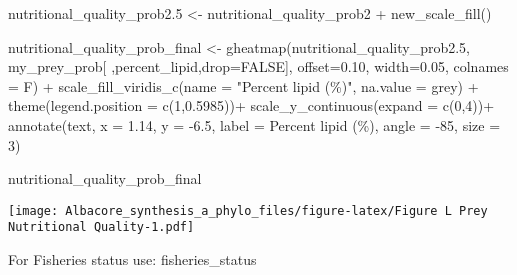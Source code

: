 \documentclass[
]{article}
\newenvironment{Shaded}{\begin{snugshade}}{\end{snugshade}}
\newcommand{\AttributeTok}[1]{\textcolor[rgb]{0.77,0.63,0.00}{#1}}
\newcommand{\ConstantTok}[1]{\textcolor[rgb]{0.00,0.00,0.00}{#1}}
\newcommand{\DecValTok}[1]{\textcolor[rgb]{0.00,0.00,0.81}{#1}}
\newcommand{\FloatTok}[1]{\textcolor[rgb]{0.00,0.00,0.81}{#1}}
\newcommand{\FunctionTok}[1]{\textcolor[rgb]{0.00,0.00,0.00}{#1}}
\newcommand{\NormalTok}[1]{#1}
\newcommand{\OtherTok}[1]{\textcolor[rgb]{0.56,0.35,0.01}{#1}}
\newcommand{\SpecialCharTok}[1]{\textcolor[rgb]{0.00,0.00,0.00}{#1}}
\newcommand{\StringTok}[1]{\textcolor[rgb]{0.31,0.60,0.02}{#1}}
\begin{document}
\begin{Shaded}
\begin{Highlighting}[]
\NormalTok{nutritional\_quality\_prob2}\FloatTok{.5} \OtherTok{\textless{}{-}}\NormalTok{ nutritional\_quality\_prob2 }\SpecialCharTok{+} \FunctionTok{new\_scale\_fill}\NormalTok{()}

\NormalTok{nutritional\_quality\_prob\_final }\OtherTok{\textless{}{-}} \FunctionTok{gheatmap}\NormalTok{(nutritional\_quality\_prob2}\FloatTok{.5}\NormalTok{, my\_prey\_prob[ ,}\StringTok{\textquotesingle{}percent\_lipid\textquotesingle{}}\NormalTok{,}\AttributeTok{drop=}\ConstantTok{FALSE}\NormalTok{], }
                                           \AttributeTok{offset=}\FloatTok{0.10}\NormalTok{, }\AttributeTok{width=}\FloatTok{0.05}\NormalTok{, }\AttributeTok{colnames =}\NormalTok{ F) }\SpecialCharTok{+}
  \FunctionTok{scale\_fill\_viridis\_c}\NormalTok{(}\AttributeTok{name =} \StringTok{"Percent lipid (\%)"}\NormalTok{, }
                       \AttributeTok{na.value =} \StringTok{\textquotesingle{}grey\textquotesingle{}}\NormalTok{) }\SpecialCharTok{+}
  \FunctionTok{theme}\NormalTok{(}\AttributeTok{legend.position =} \FunctionTok{c}\NormalTok{(}\DecValTok{1}\NormalTok{,}\FloatTok{0.5985}\NormalTok{))}\SpecialCharTok{+}
  \FunctionTok{scale\_y\_continuous}\NormalTok{(}\AttributeTok{expand =} \FunctionTok{c}\NormalTok{(}\DecValTok{0}\NormalTok{,}\DecValTok{4}\NormalTok{))}\SpecialCharTok{+}
  \FunctionTok{annotate}\NormalTok{(}\StringTok{\textquotesingle{}text\textquotesingle{}}\NormalTok{, }\AttributeTok{x =} \FloatTok{1.14}\NormalTok{, }\AttributeTok{y =} \SpecialCharTok{{-}}\FloatTok{6.5}\NormalTok{, }\AttributeTok{label =} \StringTok{\textquotesingle{}Percent lipid (\%)\textquotesingle{}}\NormalTok{, }\AttributeTok{angle =} \SpecialCharTok{{-}}\DecValTok{85}\NormalTok{, }\AttributeTok{size =} \DecValTok{3}\NormalTok{)}

\NormalTok{nutritional\_quality\_prob\_final }
\end{Highlighting}
\end{Shaded}

\texttt{[image: Albacore\_synthesis\_a\_phylo\_files/figure-latex/Figure L Prey Nutritional Quality-1.pdf]}

For Fisheries status use: fisheries\_status
\end{document}
